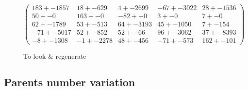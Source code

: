 \documentclass[]{report} %
\begin{document}
    \paragraph*{}
   

    \begin{figure}[H] 
            \centering
            \small
    $
          \begin{pmatrix}
                183 +- 1857 & 18 +- 629 & 4 +- 2699 & -67 +- 3022 & 28 +- 1536 \\
                50 +- 0 & 163 +- 0 & -82 +- 0 & 3 +- 0 & 7 +- 0 \\
                62 +- 1789 & 53 +- 513 & 64 +- 3193 & 45 +- 1050 & 7 +- 154 \\
                -71 +- 5017 & 52 +- 852 & 52 +- 66 & 96 +- 3062 & 37 +- 8393 \\
                -8 +- 1308 & -1 +- 2278 & 48 +- 456 & -71 +- 573 & 162 +- 101 
          \end{pmatrix}
    $
            \caption{To look \& regenerate}
            \label{mat:ps300xg200xmr1-10-10}
    \end{figure}
    
    
    \subsection{Parents number variation}
\end{document}

